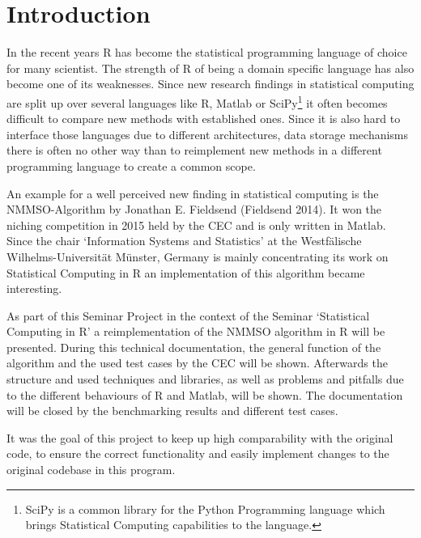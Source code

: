 \documentclass[12pt,a4paper]{article}
\begin{document}
\renewcommand\refname{References} %


\newpage
{} %
\tableofcontents
\newpage
\listoffigures

\newpage
{} %

\section{Introduction}\label{introduction}

In the recent years R has become the statistical programming language of
choice for many scientist. The strength of R of being a domain specific
language has also become one of its weaknesses. Since new research
findings in statistical computing are split up over several languages
like R, Matlab or SciPy\footnote{SciPy is a common library for the
  Python Programming language which brings Statistical Computing
  capabilities to the language. \newpage} it often becomes difficult to
compare new methods with established ones. Since it is also hard to
interface those languages due to different architectures, data storage
mechanisms there is often no other way than to reimplement new methods
in a different programming language to create a common scope.

An example for a well perceived new finding in statistical computing is
the NMMSO-Algorithm by Jonathan E. Fieldsend (Fieldsend 2014). It won
the niching competition in 2015 held by the CEC and is only written in
Matlab. Since the chair `Information Systems and Statistics' at the
Westfälische Wilhelms-Universität Münster, Germany is mainly
concentrating its work on Statistical Computing in R an implementation
of this algorithm became interesting.

As part of this Seminar Project in the context of the Seminar
`Statistical Computing in R' a reimplementation of the NMMSO algorithm
in R will be presented. During this technical documentation, the general
function of the algorithm and the used test cases by the CEC will be
shown. Afterwards the structure and used techniques and libraries, as
well as problems and pitfalls due to the different behaviours of R and
Matlab, will be shown. The documentation will be closed by the
benchmarking results and different test cases.

It was the goal of this project to keep up high comparability with the
original code, to ensure the correct functionality and easily implement
changes to the original codebase in this program.
\end{document}

